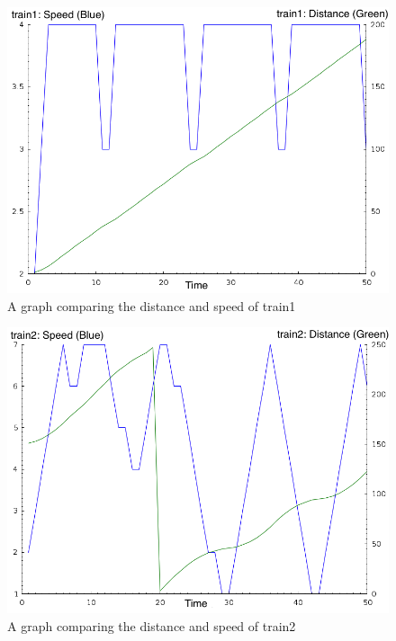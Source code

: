 \begin{figure}
\label{t1graph}
\begin{center}
\includegraphics[scale=0.5]{t1graph.png}
\end{center}
\caption{A graph comparing the distance and speed of train1}
\end{figure}

\begin{figure}
\label{t2graph}
\begin{center}
\includegraphics[scale=0.5]{t2graph.png}
\end{center}
\caption{A graph comparing the distance and speed of train2}
\end{figure}

